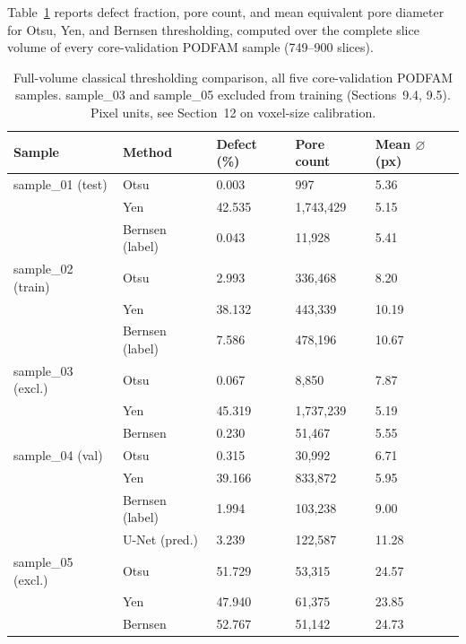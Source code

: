 
Table~\ref{tab:podfam_classical} reports defect fraction, pore count, and mean equivalent pore
diameter for Otsu, Yen, and Bernsen thresholding, computed over the complete slice volume of every
core-validation PODFAM sample (749--900 slices).

\begin{table}[htbp]
\centering
\small
\caption{Full-volume classical thresholding comparison, all five core-validation PODFAM samples.
  sample\_03 and sample\_05 excluded from training (Sections~9.4, 9.5). Pixel units, see Section~12
  on voxel-size calibration.}
\label{tab:podfam_classical}
\begin{tabular}{lllll}
\toprule
\textbf{Sample} & \textbf{Method} & \textbf{Defect (\%)} & \textbf{Pore count} & \textbf{Mean $\varnothing$ (px)} \\
\midrule
sample\_01 (test)   & Otsu             & 0.003  & 997        & 5.36 \\
                     & Yen              & 42.535 & 1,743,429  & 5.15 \\
                     & Bernsen (label)  & 0.043  & 11,928     & 5.41 \\
sample\_02 (train)  & Otsu             & 2.993  & 336,468    & 8.20 \\
                     & Yen              & 38.132 & 443,339    & 10.19 \\
                     & Bernsen (label)  & 7.586  & 478,196    & 10.67 \\
sample\_03 (excl.)  & Otsu             & 0.067  & 8,850      & 7.87 \\
                     & Yen              & 45.319 & 1,737,239  & 5.19 \\
                     & Bernsen          & 0.230  & 51,467     & 5.55 \\
sample\_04 (val)    & Otsu             & 0.315  & 30,992     & 6.71 \\
                     & Yen              & 39.166 & 833,872    & 5.95 \\
                     & Bernsen (label)  & 1.994  & 103,238    & 9.00 \\
                     & U-Net (pred.)    & 3.239  & 122,587    & 11.28 \\
sample\_05 (excl.)  & Otsu             & 51.729 & 53,315     & 24.57 \\
                     & Yen              & 47.940 & 61,375     & 23.85 \\
                     & Bernsen          & 52.767 & 51,142     & 24.73 \\
\bottomrule
\end{tabular}
\end{table}

